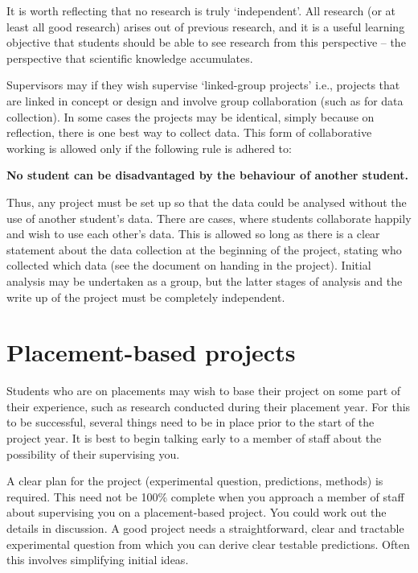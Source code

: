 \documentclass[
]{book}
\begin{document}
It is worth reflecting that no research is truly `independent'. All research (or at least all good research) arises out of previous research, and it is a useful learning objective that students should be able to see research from this perspective -- the perspective that scientific knowledge accumulates.

Supervisors may if they wish supervise `linked-group projects' i.e., projects that are linked in concept or design and involve group collaboration (such as for data collection). In some cases the projects may be identical, simply because on reflection, there is one best way to collect data. This form of collaborative working is allowed only if the following rule is adhered to:

\textbf{No student can be disadvantaged by the behaviour of another student.}

Thus, any project must be set up so that the data could be analysed without the use of another student's data. There are cases, where students collaborate happily and wish to use each other's data. This is allowed so long as there is a clear statement about the data collection at the beginning of the project, stating who collected which data (see the document on handing in the project). Initial analysis may be undertaken as a group, but the latter stages of analysis and the write up of the project must be completely independent.

\section{Placement-based projects}\label{placement-based-projects}

Students who are on placements may wish to base their project on some part of their experience, such as research conducted during their placement year. For this to be successful, several things need to be in place prior to the start of the project year. It is best to begin talking early to a member of staff about the possibility of their supervising you.

A clear plan for the project (experimental question, predictions, methods) is required. This need not be 100\% complete when you approach a member of staff about supervising you on a placement-based project. You could work out the details in discussion. A good project needs a straightforward, clear and tractable experimental question from which you can derive clear testable predictions. Often this involves simplifying initial ideas.
\end{document}
